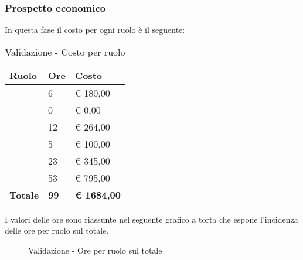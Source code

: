 		\subsubsection{Prospetto economico} %
		\label{ssub:prospetto_economico}
		In questa fase il costo per ogni ruolo è il seguente: \\
				\begin{table}[!ht]
					\begin{center}
						\begin{tabularx}{0.65\textwidth}{|l|l|X|}
							\hline
							\textbf{Ruolo} & \textbf{Ore} & \textbf{Costo} \\
							\hline
							\roleProjectManager & 6 & \euro{} 180,00 \\
							\hline
							\roleAnalyst & 0 & \euro{} 0,00 \\
							\hline
							\roleDesigner & 12 & \euro{} 264,00 \\
							\hline
							\roleAdministrator & 5 & \euro{} 100,00 \\
							\hline
							\roleProgrammer & 23 & \euro{} 345,00 \\
							\hline
							\roleVerifier & 53 & \euro{} 795,00 \\
							\hline
							\textbf{Totale} & \textbf{99} & \textbf{\euro{} 1684,00} \\
							\hline
						\end{tabularx}
					\end{center}
				\caption{Validazione - Costo per ruolo}
				\end{table}

				\noindent
				I valori delle ore sono riassunte nel seguente grafico a torta che espone l’incidenza delle ore per ruolo sul totale.
				\begin{center}
					\begin{figure}[htbp]
					\vspace{0.8cm}
					\caption{Validazione - Ore per ruolo sul totale}
					\end{figure}
				\end{center}

